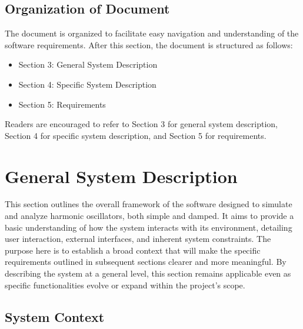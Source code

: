 \documentclass[12pt]{article}
\begin{document}
\subsection{Organization of Document}

The document is organized to facilitate easy navigation and understanding 
of the software requirements. After this section, the document is structured 
as follows:

\begin{itemize}
  \item Section 3: General System Description
  \item Section 4: Specific System Description
  \item Section 5: Requirements
\end{itemize}

Readers are encouraged to refer to Section 3 for general system description, 
Section 4 for specific system description, and Section 5 for requirements.

\section{General System Description}

This section outlines the overall framework of the software designed to 
simulate and analyze harmonic oscillators, both simple and damped. It aims 
to provide a basic understanding of how the system interacts with 
its environment, detailing user interaction, external interfaces, and 
inherent system constraints. The purpose here is to establish a broad 
context that will make the specific requirements outlined in subsequent 
sections clearer and more meaningful. By describing the system at a general 
level, this section remains applicable even as specific functionalities 
evolve or expand within the project's scope.

\subsection{System Context}

\end{document}
